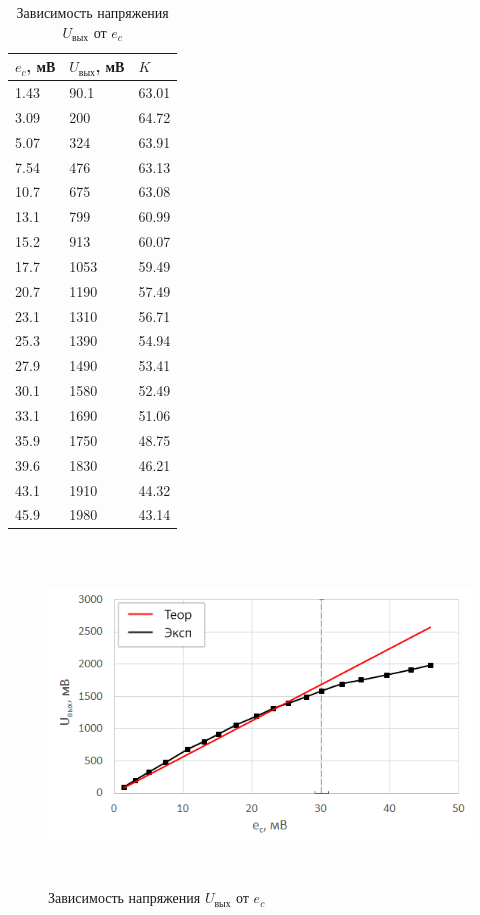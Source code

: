 \begin{table}[H]
	\begin{center}
	\caption{Зависимость напряжения $U_\text{вых}$ от $e_c$}
	\def\arraystretch{1.2}
		\begin{tabularx}{\textwidth}{|X|X|X|}
			\hline
			$e_c$, мВ & $U_\text{вых}$, мВ & $K$ \\\hline			
			1.43 & 90.1 & 63.01\\\hline	
			3.09 & 200 & 64.72\\\hline	
			5.07 & 324 & 63.91\\\hline	
			7.54 & 476 & 63.13\\\hline	
			10.7 & 675 & 63.08\\\hline	
			13.1 & 799 & 60.99\\\hline	
			15.2 & 913 & 60.07\\\hline	
			17.7 & 1053 & 59.49\\\hline	
			20.7 & 1190 & 57.49\\\hline	
			23.1 & 1310 & 56.71\\\hline	
			25.3 & 1390 & 54.94\\\hline	
			27.9 & 1490 & 53.41\\\hline	
			30.1 & 1580 & 52.49\\\hline\hline	
			33.1 & 1690 & 51.06\\\hline	
			35.9 & 1750 & 48.75\\\hline	
			39.6 & 1830 & 46.21\\\hline	
			43.1 & 1910 & 44.32\\\hline	
			45.9 & 1980 & 43.14\\\hline
		\end{tabularx}
		\label{tabular:2}
	\end{center}
\end{table}

\begin{figure}[H]
	\begin{center}
		\includegraphics[height=9cm]{img/1}
		\caption{Зависимость напряжения $U_\text{вых}$ от $e_c$}
		\label{figure:2}
	\end{center}
\end{figure}

